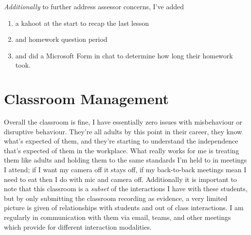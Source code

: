 \documentclass[paper=a4,justified,a4paper]{tufte-handout}
\providecommand{\tightlist}{%
  \setlength{\itemsep}{0pt}\setlength{\parskip}{0pt}}
\begin{document}
\emph{Additionally} to further address assessor concerns, I've added

\begin{enumerate}
\def\labelenumi{\arabic{enumi}.}
\tightlist
\item
  a kahoot at the start to recap the last lesson
\item
  and homework question period
\item
  and did a Microsoft Form in chat to determine how long their homework
  took.
\end{enumerate}

\hypertarget{classroom-management}{%
\section{Classroom Management}\label{classroom-management}}

Overall the classroom is fine, I have essentially zero issues with
misbehaviour or disruptive behaviour. They're all adults by this point
in their career, they know what's expected of them, and they're starting
to understand the independence that's expected of them in the workplace.
What really works for me is treating them like adults and holding them
to the same standards I'm held to in meetings I attend; if I want my
camera off it stays off, if my back-to-back meetings mean I need to eat
then I do with mic and camera off. Additionally it is important to note
that this classroom is a \emph{subset} of the interactions I have with
these students, but by only submitting the classroom recording as
evidence, a very limited picture is given of relationships with students
and out of class interactions. I am regularly in communication with them
via email, teams, and other meetings which provide for different
interaction modalities.
\end{document}
